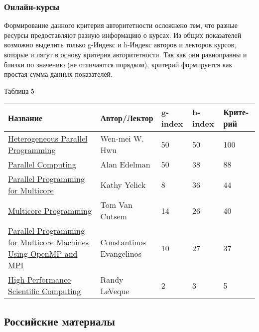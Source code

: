 \documentclass{article}
\begin{document}
		\subsubsection{Онлайн-курсы}
		Формирование данного критерия авторитетности осложнено тем, что разные ресурсы предоставляют разную информацию о курсах. Из общих показателей возможно выделить только g-Индекс и h-Индекс авторов и лекторов курсов, которые и лягут в основу критерия авторитетности. Так как они равноправны и близки по значению (не отличаются порядком), критерий формируется как простая сумма данных показателей.

	\begin{flushleft}
				Таблица 5
				\begin{longtable}{|p{5.5cm}|p{4cm}|p{1.55cm}|p{1.6cm}|p{1.7cm}|}
\hline
Название & Автор/Лектор & g-index & h-index & Крите-рий \\\hline

\href{https://ru.coursera.org/course/hetero}{Heterogeneous Parallel Programming} &
Wen-mei W. Hwu & 50 & 50 & 100\\\hline

\href{http://ocw.mit.edu/courses/mathematics/18-337j-parallel-computing-fall-2011}{Parallel Computing} &
Alan Edelman & 50 & 38 & 88\\\hline

\href{http://www.cs.berkeley.edu/~yelick/cs194f07/main.html}{Parallel Programming for Multicore} &
Kathy Yelick & 8 & 36 & 44\\\hline

\href{http://soft.vub.ac.be/~tvcutsem/multicore}{Multicore Programming} &
Tom Van Cutsem & 14 & 26 & 40\\\hline

\href{http://ocw.mit.edu/courses/earth-atmospheric-and-planetary-sciences/12-950-parallel-programming-for-multicore-machines-using-openmp-and-mpi-january-iap-2010}{Parallel Programming for Multicore Machines Using OpenMP and MPI} &
Constantinos Evangelinos & 10 & 27 & 37\\\hline

\href{https://www.coursera.org/course/scicomp}{High Performance Scientific Computing} &
Randy LeVeque & 2 & 3 & 5\\\hline
				\end{longtable}
			\end{flushleft}
\newpage

	\subsection{Российские материалы}
\end{document}
